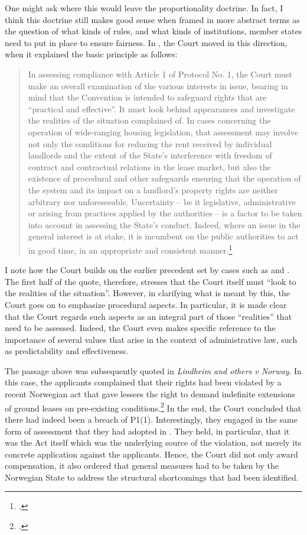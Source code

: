 \documentclass[12pt,a4paper]{book} %
\begin{document}
One might ask where this would leave the proportionality doctrine. In fact, I think this doctrine still makes good sense when framed in more abstract terms as the question of what kinds of rules, and what kinds of institutions, member states need to put in place to ensure fairness. In \textcite{hutten06}, the Court moved in this direction, when it explained the basic principle as follows:

\begin{quote}
In assessing compliance with Article 1 of Protocol No. 1, the Court must make an overall examination of the various interests in issue, bearing in mind that the Convention is intended to safeguard rights that are “practical and effective”. It must look behind appearances and investigate the realities of the situation complained of. In cases concerning the operation of wide-ranging housing legislation, that assessment may involve not only the conditions for reducing the rent received by individual landlords and the extent of the State’s interference with freedom of contract and contractual relations in the lease market, but also the existence of procedural and other safeguards ensuring that the operation of the system and its impact on a landlord’s property rights are neither arbitrary nor unforeseeable. Uncertainty – be it legislative, administrative or arising from practices applied by the authorities – is a factor to be taken into account in assessing the State’s conduct. Indeed, where an issue in the general interest is at stake, it is incumbent on the public authorities to act in good time, in an appropriate and consistent manner.\footcite[151]{hutten06} 
\end{quote}

I note how the Court builds on the earlier precedent set by cases such as \textcite{sporrong82} and \textcite{james86}. The first half of the quote, therefore, stresses that the Court itself must ``look to the realities of the situation''. However, in clarifying what is meant by this, the Court goes on to emphasize procedural aspects. In particular, it is made clear that the Court regards such aspects as an integral part of those ``realities'' that need to be assessed. Indeed, the Court even makes specific reference to the importance of several values that arise in the context of administrative law, such as predictability and effectiveness.

The passage above was subsequently quoted in {\it Lindheim and others v Norway}. In this case, the applicants complained that their rights had been violated by a recent Norwegian act that gave lessees the right to demand indefinite extensions of ground leases on pre-existing conditions.\footcite[119]{lindheim12}  In the end, the Court concluded that there had indeed been a breach of P1(1). Interestingly, they engaged in the same form of assessment that they had adopted in \textcite{hutten06}. They held, in particular, that it was the Act itself which was the underlying source of the violation, not merely its concrete application against the applicants. Hence, the Court did not only award compensation, it also ordered that general measures had to be taken by the Norwegian State to address the structural shortcomings that had been identified.
\end{document}
